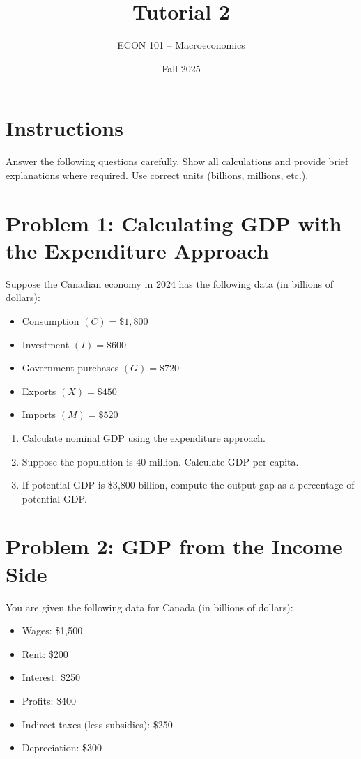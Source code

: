 \documentclass[11pt]{article}
\title{Tutorial 2}
\author{ECON 101 -- Macroeconomics}
\date{Fall 2025}
\begin{document}
\maketitle

\section*{Instructions}
Answer the following questions carefully. Show all calculations and provide brief explanations where required. Use correct units (billions, millions, etc.). 

\bigskip

\section*{Problem 1: Calculating GDP with the Expenditure Approach}
Suppose the Canadian economy in 2024 has the following data (in billions of dollars):  
\begin{itemize}
    \item Consumption $(C) = \$1{,}800$  
    \item Investment $(I) = \$600$  
    \item Government purchases $(G) = \$720$  
    \item Exports $(X) = \$450$  
    \item Imports $(M) = \$520$  
\end{itemize}

\begin{enumerate}[label=\alph*)]
    \item Calculate nominal GDP using the expenditure approach.  
    \item Suppose the population is 40 million. Calculate GDP per capita.  
    \item If potential GDP is \$3{,}800 billion, compute the output gap as a percentage of potential GDP.  
\end{enumerate}

\bigskip

\section*{Problem 2: GDP from the Income Side}
You are given the following data for Canada (in billions of dollars):  
\begin{itemize}
    \item Wages: \$1{,}500  
    \item Rent: \$200  
    \item Interest: \$250  
    \item Profits: \$400  
    \item Indirect taxes (less subsidies): \$250  
    \item Depreciation: \$300  
\end{itemize}
\end{document}
